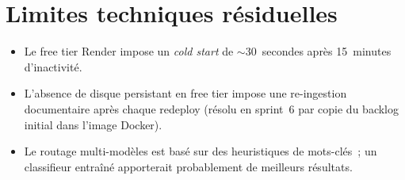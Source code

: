 \section{Limites techniques résiduelles}
\begin{itemize}
  \item Le free tier Render impose un \emph{cold start} de
        $\sim$30~secondes après 15~minutes d'inactivité.
  \item L'absence de disque persistant en free tier impose une
        re-ingestion documentaire après chaque redeploy
        (résolu en sprint~6 par copie du backlog initial dans
        l'image Docker).
  \item Le routage multi-modèles est basé sur des heuristiques de
        mots-clés~; un classifieur entraîné apporterait
        probablement de meilleurs résultats.
\end{itemize}
